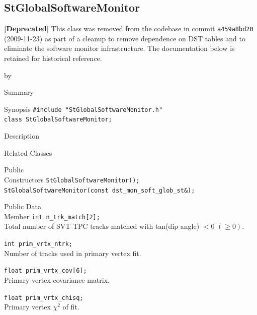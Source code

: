 \documentclass[twoside]{article}
\newcommand{\entrylabel}[1]{\mbox{\textbf{{#1}}}\hfil}%
\newenvironment{entry}
{\begin{list}{}%
    {\renewcommand{\makelabel}{\entrylabel}%
     \setlength{\labelwidth}{90pt}%
     \setlength{\leftmargin}{\labelwidth}
     \advance\leftmargin by \labelsep%
      }%
    }%
  {\end{list}}
\newcommand{\Entrylabel}[1]%
{\raisebox{0pt}[1ex][0pt]{\makebox[\labelwidth][l]%
    {\parbox[t]{\labelwidth}{\hspace{0pt}\textbf{{#1}}}}}}
\newenvironment{Entry}%
{\renewcommand{\entrylabel}{\Entrylabel}\begin{entry}}%
  {\end{entry}}
\begin{document}
\subsection{StGlobalSoftwareMonitor}
\label{sec:StGlobalSoftwareMonitor}
\textbf{[Deprecated]} This class was removed from the codebase in commit
\texttt{a459a8bd20} (2009-11-23) as part of a cleanup to remove dependence on
DST tables and to eliminate the software monitor infrastructure.
The documentation below is retained for historical reference.

\begin{Entry}
\item[Summary]
\item[Synopsis]
    \verb+#include "StGlobalSoftwareMonitor.h"+\\
    \verb+class StGlobalSoftwareMonitor;+\\
\item[Description]
\item[Related Classes]
\item[Public\\ Constructors]
    \verb+StGlobalSoftwareMonitor();+\\
    \verb+StGlobalSoftwareMonitor(const dst_mon_soft_glob_st&);+\\
\item[Public Data\\ Member]
    \verb+int n_trk_match[2];+\\
    Total number of SVT-TPC tracks matched with tan(dip angle) $< 0$
    $(\ge 0)$.

    \verb+int prim_vrtx_ntrk;+\\
    Number of tracks used in primary vertex fit.

    \verb+float prim_vrtx_cov[6];+\\
    Primary vertex covariance matrix.

    \verb+float prim_vrtx_chisq;+\\
    Primary vertex $\chi^2$ of fit.
\end{Entry}
\clearpage
\end{document}
